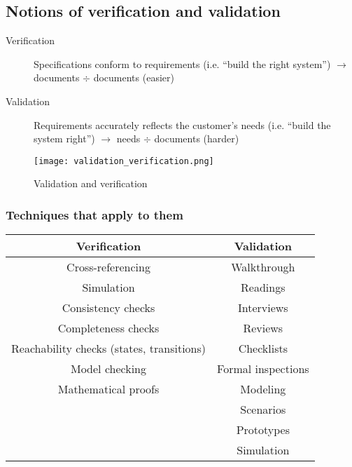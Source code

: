 \subsection{Notions of verification and validation}

\begin{description}
    \item[Verification] Specifications conform to requirements (i.e. \enquote{build the right system})
        \subitem{} $\rightarrow$ documents $\div$ documents (easier)
    \item[Validation] Requirements accurately reflects the customer's needs (i.e. \enquote{build the system right})
        \subitem{} $\rightarrow$ needs $\div$ documents (harder)
\end{description}

\begin{figure}[!ht]
    \centering
    \texttt{[image: validation\_verification.png]}
    \caption{Validation and verification}
\end{figure}
\FloatBarrier{}

\subsubsection{Techniques that apply to them}

\begin{table}[!ht]
    \begin{center}
        \begin{tabular}{cc}
            \toprule
            Verification            & Validation \\
            \midrule
            Cross-referencing       & Walkthrough \\
            Simulation              & Readings \\
            Consistency checks      & Interviews \\
            Completeness checks     & Reviews \\
            Reachability checks (states, transitions) & Checklists \\
            Model checking          & Formal inspections \\
            Mathematical proofs     & Modeling \\
                                    & Scenarios \\
                                    & Prototypes \\
                                    & Simulation \\
            \bottomrule
        \end{tabular}
    \end{center}
\end{table}

